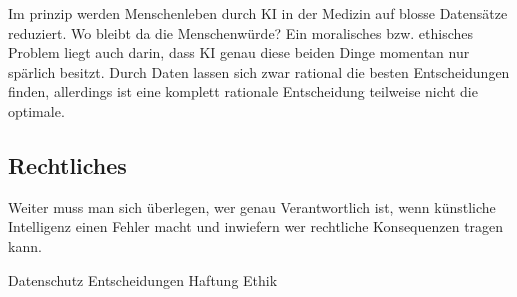 Im prinzip werden Menschenleben durch KI in der Medizin auf blosse Datensätze reduziert. Wo bleibt da die Menschenwürde?
Ein moralisches bzw. ethisches Problem liegt auch darin, dass KI genau diese beiden Dinge momentan nur spärlich besitzt. 
Durch Daten lassen sich zwar rational  die besten Entscheidungen finden, allerdings ist eine komplett rationale Entscheidung teilweise nicht die optimale.

\subsection{Rechtliches}
Weiter muss man sich überlegen, wer genau Verantwortlich ist, wenn künstliche Intelligenz einen Fehler macht und inwiefern wer rechtliche Konsequenzen tragen kann.


\vspace{1cm}
Datenschutz
Entscheidungen
Haftung
Ethik
